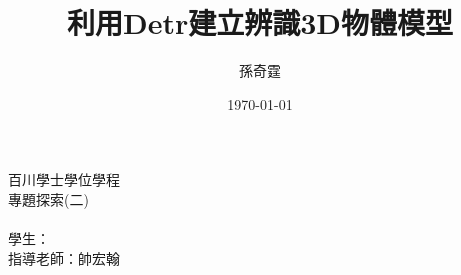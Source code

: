 \documentclass[12pt]{article}
\title{利用Detr建立辨識3D物體模型}
\author{孫奇霆}
\date{\today}
\begin{document}
    \begin{titlepage}
        \begin{center}
            \Large 百川學士學位學程\\
            專題探索(二)\\
            \vspace{2cm}
            \Large \thetitle
            \vspace{2cm}\\
            學生：\theauthor\\
            指導老師：帥宏翰\\
            \vspace{2cm}


        \end{center}
    \end{titlepage}
\end{document}
